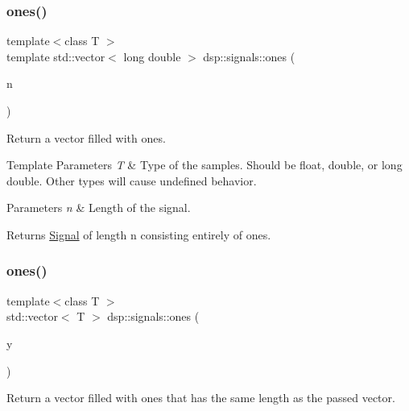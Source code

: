 \subsubsection{\texorpdfstring{ones()}{ones()}\hspace{0.1cm}{\footnotesize\ttfamily [1/2]}}
{\footnotesize\ttfamily template$<$class T $>$ \\
template std\+::vector$<$ long double $>$ dsp\+::signals\+::ones (\begin{DoxyParamCaption}\item[{size\+\_\+t}]{n }\end{DoxyParamCaption})}



Return a vector filled with ones. 


\begin{DoxyTemplParams}{Template Parameters}
{\em T} & Type of the samples. Should be float, double, or long double. Other types will cause undefined behavior. \\
\hline
\end{DoxyTemplParams}

\begin{DoxyParams}{Parameters}
{\em n} & Length of the signal. \\
\hline
\end{DoxyParams}
\begin{DoxyReturn}{Returns}
\mbox{\hyperlink{classdsp_1_1_signal}{Signal}} of length n consisting entirely of ones. 
\end{DoxyReturn}
\mbox{\label{namespacedsp_1_1signals_ae16d81991d7fe9195392aa7ca3d34297}} 
\subsubsection{\texorpdfstring{ones()}{ones()}\hspace{0.1cm}{\footnotesize\ttfamily [2/2]}}
{\footnotesize\ttfamily template$<$class T $>$ \\
std\+::vector$<$ T $>$ dsp\+::signals\+::ones (\begin{DoxyParamCaption}\item[{const std\+::vector$<$ T $>$ \&}]{y }\end{DoxyParamCaption})}



Return a vector filled with ones that has the same length as the passed vector. 


